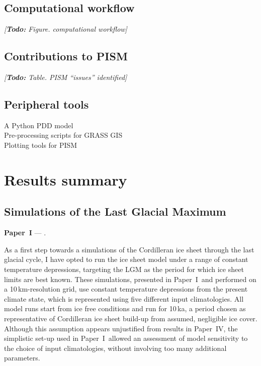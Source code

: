\documentclass{article}
\newcommand{\todo}[1]{\emph{[\textbf{Todo:} #1]}}
\newcommand{\CCLI}[0]{Paper~I}      %
\newcommand{\CCYC}[0]{Paper~IV}     %
\begin{document}
\subsection{Computational workflow}
\todo{Figure. computational workflow}

\subsection{Contributions to PISM}
\todo{Table. PISM ``issues'' identified}

\subsection{Peripheral tools}
A Python PDD model\\
Pre-processing scripts for GRASS GIS\\
Plotting tools for PISM\\

\section{Results summary}

\subsection{Simulations of the Last Glacial Maximum}

\noindent\textbf{\CCLI} --- .
\bigskip

As a first step towards a simulations of the Cordilleran ice sheet through the
last glacial cycle, I have opted to run the ice sheet model under a range of
constant temperature depressions, targeting the LGM as the period for which ice
sheet limits are best known. These simulations, presented in \CCLI\ and
performed on a 10\,km-resolution grid, use constant temperature depressions
from the present climate state, which is represented using five different input
climatologies. All model runs start
from ice free conditions and run for 10\,ka, a period chosen as representative
of Cordilleran ice sheet build-up from assumed, negligible ice cover. Although
this assumption appears unjustified from results in \CCYC, the simplistic
set-up used in \CCLI\ allowed an assessment of model sensitivity to the choice
of input climatologies, without involving too many additional parameters.
\end{document}
